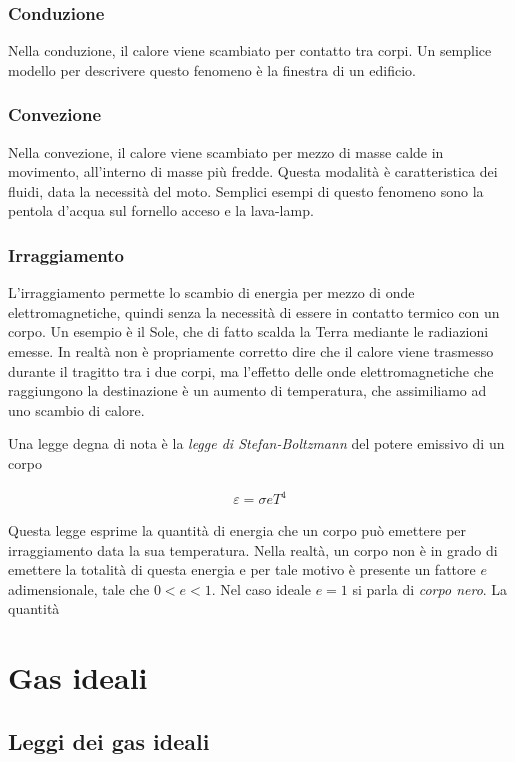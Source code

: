 \subsubsection{Conduzione}
Nella conduzione, il calore viene scambiato per contatto tra corpi.
Un semplice modello per descrivere questo fenomeno è la finestra di
un edificio.

\subsubsection{Convezione}
Nella convezione, il calore viene scambiato per mezzo di masse calde
in movimento, all'interno di masse più fredde. Questa modalità è
caratteristica dei fluidi, data la necessità del moto. Semplici esempi
di questo fenomeno sono la pentola d'acqua sul fornello acceso e la
lava-lamp.

\subsubsection{Irraggiamento}
L'irraggiamento permette lo scambio di energia per mezzo di onde
elettromagnetiche, quindi senza la necessità di essere in contatto
termico con un corpo. Un esempio è il Sole, che di fatto scalda la
Terra mediante le radiazioni emesse. In realtà non è propriamente
corretto dire che il calore viene trasmesso durante il tragitto tra
i due corpi, ma l'effetto delle onde elettromagnetiche che raggiungono
la destinazione è un aumento di temperatura, che assimiliamo ad uno
scambio di calore.

Una legge degna di nota è la \textit{legge di Stefan-Boltzmann} del
potere emissivo di un corpo

\begin{align}
    \varepsilon = \sigma e T^4
\end{align}

\noindent Questa legge esprime la quantità di energia che un corpo
può emettere per irraggiamento data la sua temperatura. Nella realtà,
un corpo non è in grado di emettere la totalità di questa energia
e per tale motivo è presente un fattore $e$ adimensionale, tale che
$0 < e < 1$. Nel caso ideale $e = 1$ si parla di \textit{corpo nero}.
La quantità

\section{Gas ideali}

\subsection{Leggi dei gas ideali}

